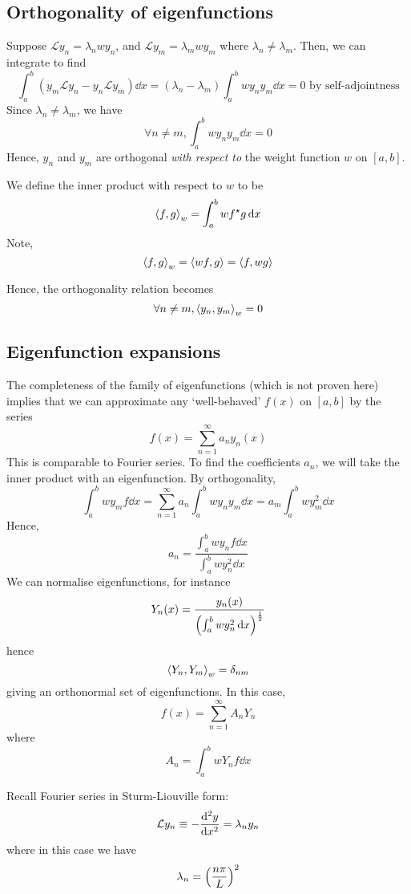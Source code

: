 \subsection{Orthogonality of eigenfunctions}
Suppose \( \mathcal L y_n = \lambda_n w y_n \), and \( \mathcal L y_m = \lambda_m w y_m \) where \( \lambda_n \neq \lambda_m \).
Then, we can integrate to find
\[
	\int_a^b (y_m \mathcal L y_n - y_n \mathcal L y_m) \dd{x} = (\lambda_n - \lambda_m) \int_a^b w y_n y_m \dd{x} = 0 \text{ by self-adjointness}
\]
Since \( \lambda_n \neq \lambda_m \), we have
\[
	\forall n \neq m, \int_a^b w y_n y_m \dd{x} = 0
\]
Hence, \( y_n \) and \( y_m \) are orthogonal \textit{with respect to} the weight function \( w \) on \( [a,b] \).
\begin{definition}
	We define the inner product with respect to \( w \) to be
	\[
		\left\langle{f,g}\right\rangle_w = \int_a^b w f^\star g \dd{x}
	\]
	Note,
	\[
		\left\langle{f,g}\right\rangle_w = \left\langle{wf,g}\right\rangle = \left\langle{f,wg}\right\rangle
	\]
\end{definition}
Hence, the orthogonality relation becomes
\[
	\forall n \neq m, \left\langle{y_n, y_m}\right\rangle_w = 0
\]

\subsection{Eigenfunction expansions}
The completeness of the family of eigenfunctions (which is not proven here) implies that we can approximate any `well-behaved' \( f(x) \) on \( [a,b] \) by the series
\[
	f(x) = \sum_{n=1}^\infty a_n y_n(x)
\]
This is comparable to Fourier series.
To find the coefficients \( a_n \), we will take the inner product with an eigenfunction.
By orthogonality,
\[
	\int_a^b w y_m f \dd{x} = \sum_{n=1}^\infty a_n \int_a^b w y_n y_m \dd{x} = a_m \int_a^b w y_m^2 \dd{x}
\]
Hence,
\[
	a_n = \frac{\int_a^b w y_n f \dd{x}}{\int_a^b w y_n^2 \dd{x}}
\]
We can normalise eigenfunctions, for instance
\[
	Y_n(x) = \frac{y_n(x)}{\qty(\int_a^b w y_n^2 \dd{x})^{\frac{1}{2}}}
\]
hence
\[
	\left\langle{Y_n, Y_m}\right\rangle_w = \delta_{nm}
\]
giving an orthonormal set of eigenfunctions.
In this case,
\[
	f(x) = \sum_{n=1}^\infty A_n Y_n
\]
where
\[
	A_n = \int_a^b w Y_n f \dd{x}
\]
\begin{example}
	Recall Fourier series in Sturm-Liouville form:
	\[
		\mathcal L y_n \equiv - \dv[2]{y}{x} = \lambda_n y_n
	\]
	where in this case we have
	\[
		\lambda_n = \qty(\frac{n \pi}{L})^2
	\]
\end{example}

